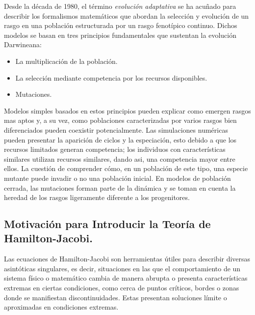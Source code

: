 \citep{Mirrahimi2011} Desde la década de 1980, el término \textit{evolución adaptativa} se ha acuñado para describir los formalismos matemáticos que abordan la selección y evolución de un rasgo en una población estructurada por un rasgo fenotípico continuo. Dichos modelos se basan en tres principios fundamentales que sustentan la evolución Darwineana:

\begin{itemize}
	\item {

	      {La multiplicación de la población.}

	      }

	\item {

	      {La selección mediante competencia por los recursos disponibles.}
	      }

	\item {

	      {Mutaciones.}

	      }
\end{itemize}

Modelos simples basados en estos principios pueden explicar como emergen rasgos mas aptos y, a su vez, como poblaciones caracterizadas por varios rasgos bien diferenciados pueden coexistir potencialmente. Las simulaciones numéricas pueden presentar la aparición de ciclos y la especiación, esto debido a que los recursos limitados generan competencia; los individuos con características similares utilizan recursos similares, dando asi, una competencia mayor entre ellos. La cuestión de comprender cómo, en un población de este tipo, una especie mutante puede invadir o no una población inicial. En modelos de población cerrada, las mutaciones forman parte de la dinámica y se toman en cuenta la heredad de los rasgos ligeramente diferente a los progenitores.

\subsection{Motivación para Introducir la Teoría de Hamilton-Jacobi.}

\citep{barles2007} Las ecuaciones de Hamilton-Jacobi son herramientas útiles para describir diversas asintóticas singulares, es decir, situaciones en las que el comportamiento de un sistema físico o matemático cambia  de manera abrupta o presenta características extremas en ciertas condiciones, como cerca de puntos críticos, bordes o zonas donde se manifiestan discontinuidades. Estas presentan soluciones límite o aproximadas en condiciones extremas.


